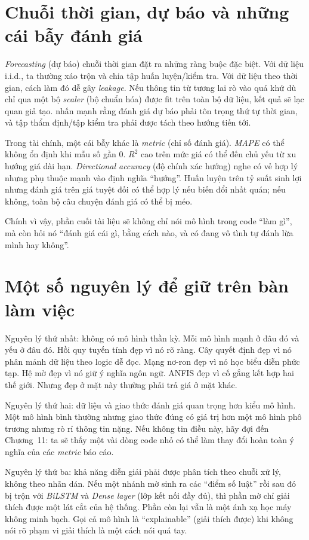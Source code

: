 \section{Chuỗi thời gian, dự báo và những cái bẫy đánh giá}

\emph{Forecasting} (dự báo) chuỗi thời gian đặt ra những ràng buộc đặc biệt. Với dữ liệu i.i.d., ta thường xáo trộn và chia tập huấn luyện/kiểm tra. Với dữ liệu theo thời gian, cách làm đó dễ gây \emph{leakage}. Nếu thông tin từ tương lai rò vào quá khứ dù chỉ qua một bộ \emph{scaler} (bộ chuẩn hóa) được fit trên toàn bộ dữ liệu, kết quả sẽ lạc quan giả tạo. \citet{hyndman2021fpp3} nhấn mạnh rằng đánh giá dự báo phải tôn trọng thứ tự thời gian, và tập thẩm định/tập kiểm tra phải được tách theo hướng tiến tới.

Trong tài chính, một cái bẫy khác là \emph{metric} (chỉ số đánh giá). \emph{MAPE} có thể không ổn định khi mẫu số gần 0. $R^2$ cao trên mức giá có thể đến chủ yếu từ xu hướng giá dài hạn. \emph{Directional accuracy} (độ chính xác hướng) nghe có vẻ hợp lý nhưng phụ thuộc mạnh vào định nghĩa ``hướng''. Huấn luyện trên tỷ suất sinh lợi nhưng đánh giá trên giá tuyệt đối có thể hợp lý nếu biến đổi nhất quán; nếu không, toàn bộ câu chuyện đánh giá có thể bị méo.

Chính vì vậy, phần cuối tài liệu sẽ không chỉ nói mô hình trong code ``làm gì'', mà còn hỏi nó ``đánh giá cái gì, bằng cách nào, và có đang vô tình tự đánh lừa mình hay không''.

\section{Một số nguyên lý để giữ trên bàn làm việc}

Nguyên lý thứ nhất: không có mô hình thần kỳ. Mỗi mô hình mạnh ở đâu đó và yếu ở đâu đó. Hồi quy tuyến tính đẹp vì nó rõ ràng. Cây quyết định đẹp vì nó phân mảnh dữ liệu theo logic dễ đọc. Mạng nơ-ron đẹp vì nó học biểu diễn phức tạp. Hệ mờ đẹp vì nó giữ ý nghĩa ngôn ngữ. ANFIS đẹp vì cố gắng kết hợp hai thế giới. Nhưng đẹp ở mặt này thường phải trả giá ở mặt khác.

Nguyên lý thứ hai: dữ liệu và giao thức đánh giá quan trọng hơn kiểu mô hình. Một mô hình bình thường nhưng giao thức đúng có giá trị hơn một mô hình phô trương nhưng rò rỉ thông tin nặng. Nếu không tin điều này, hãy đợi đến Chương~11: ta sẽ thấy một vài dòng code nhỏ có thể làm thay đổi hoàn toàn ý nghĩa của các \emph{metric} báo cáo.

Nguyên lý thứ ba: khả năng diễn giải phải được phân tích theo chuỗi xử lý, không theo nhãn dán. Nếu một nhánh mờ sinh ra các ``điểm số luật'' rồi sau đó bị trộn với \emph{BiLSTM} và \emph{Dense layer} (lớp kết nối đầy đủ), thì phần mờ chỉ giải thích được một lát cắt của hệ thống. Phần còn lại vẫn là một ánh xạ học máy không minh bạch. Gọi cả mô hình là ``explainable'' (giải thích được) khi không nói rõ phạm vi giải thích là một cách nói quá tay.

